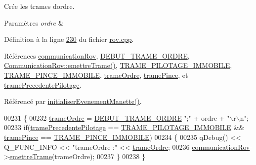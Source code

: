 Crée les trames d\textquotesingle{}ordre. 


\begin{DoxyParams}{Paramètres}
{\em ordre} & \\
\hline
\end{DoxyParams}


Définition à la ligne \hyperlink{rov_8cpp_source_l00230}{230} du fichier \hyperlink{rov_8cpp_source}{rov.\+cpp}.



Références \hyperlink{rov_8h_source_l00097}{communication\+Rov}, \hyperlink{rov_8h_source_l00046}{D\+E\+B\+U\+T\+\_\+\+T\+R\+A\+M\+E\+\_\+\+O\+R\+D\+RE}, \hyperlink{communicationrov_8cpp_source_l00060}{Communication\+Rov\+::emettre\+Trame()}, \hyperlink{rov_8h_source_l00058}{T\+R\+A\+M\+E\+\_\+\+P\+I\+L\+O\+T\+A\+G\+E\+\_\+\+I\+M\+M\+O\+B\+I\+LE}, \hyperlink{rov_8h_source_l00064}{T\+R\+A\+M\+E\+\_\+\+P\+I\+N\+C\+E\+\_\+\+I\+M\+M\+O\+B\+I\+LE}, \hyperlink{rov_8h_source_l00104}{trame\+Ordre}, \hyperlink{rov_8h_source_l00105}{trame\+Pince}, et \hyperlink{rov_8h_source_l00103}{trame\+Precedente\+Pilotage}.



Référencé par \hyperlink{rov_8cpp_source_l00052}{initialiser\+Evenement\+Manette()}.


\begin{DoxyCode}
00231 \{
00232     \hyperlink{class_rov_aa813010d76738e268a4bbe3773663a38}{trameOrdre} = \hyperlink{rov_8h_a8b313ffefec16809296d06146e0e75c8}{DEBUT\_TRAME\_ORDRE} \textcolor{stringliteral}{";"} + ordre + \textcolor{stringliteral}{"\(\backslash\)r\(\backslash\)n"};
00233     \textcolor{keywordflow}{if}(\hyperlink{class_rov_a12b08128a49ca43fc1198fdeb6a6f0cd}{tramePrecedentePilotage} == \hyperlink{rov_8h_ab218eea9b0b6d799e400a0d1ff835c13}{TRAME\_PILOTAGE\_IMMOBILE} && 
      \hyperlink{class_rov_a2c24d7c884d8fae07e452105037f8e2c}{tramePince} == \hyperlink{rov_8h_ab46e52d96e193353eadd9cd7f598f670}{TRAME\_PINCE\_IMMOBILE})
00234     \{
00235         qDebug() << Q\_FUNC\_INFO << \textcolor{stringliteral}{"trameOrdre :"} << \hyperlink{class_rov_aa813010d76738e268a4bbe3773663a38}{trameOrdre};
00236         \hyperlink{class_rov_a8e7aaa17ee2134f26d57241d11ab2a99}{communicationRov}->\hyperlink{class_communication_rov_a4f52076db8d6e78abe1745fa1e235272}{emettreTrame}(trameOrdre);
00237     \}
00238 \}
\end{DoxyCode}
\mbox{\label{class_rov_a97be62676ab0d57d5a8ac498147905ec}} 
